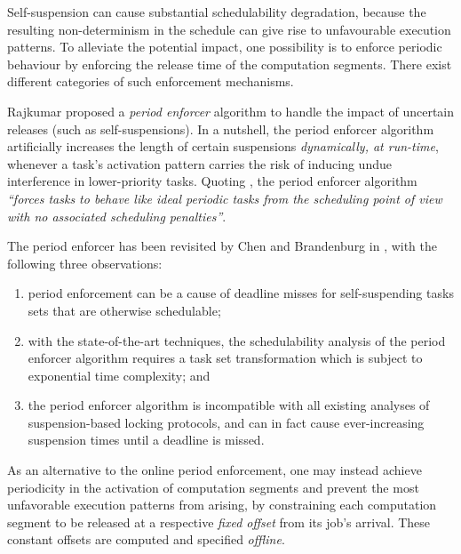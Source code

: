 \label{sec:release-enforce}

Self-suspension can cause substantial schedulability degradation, because the resulting non-determinism in the schedule can give rise 
to unfavourable execution patterns. To alleviate the potential impact, one possibility is to enforce periodic behaviour by 
enforcing the release time of the computation segments. There exist different categories of such enforcement mechanisms. 


\label{sec:period-enforce}

Rajkumar \cite{Raj:suspension1991} proposed a \emph{period enforcer} 
algorithm to handle the impact of uncertain releases (such as self-suspensions). In a nutshell, the period enforcer algorithm artificially 
increases the length of certain suspensions \emph{dynamically, at run-time},
whenever a task's activation pattern carries the risk of inducing undue interference in 
lower-priority tasks. Quoting \cite{Raj:suspension1991}, the period enforcer algorithm \textit{``forces tasks to behave like ideal 
periodic tasks from the scheduling point of view with no associated scheduling penalties''}. 

The period enforcer has been revisited by Chen and Brandenburg in \cite{ChenBrandenburg}, with the following three observations:
\begin{enumerate}
	\item period enforcement can be a cause of deadline misses for self-suspending tasks sets that are otherwise schedulable;
	\item with the state-of-the-art techniques, the schedulability analysis of the period enforcer algorithm requires a task set 
	transformation which is subject to exponential time complexity; and 	
    \item the period enforcer algorithm is incompatible with all existing analyses of suspension-based locking protocols, 
	and can in fact cause ever-increasing suspension times until a deadline is missed.
\end{enumerate}

\label{sec:static-period-enforce}

As an alternative to the online period enforcement, one may instead achieve periodicity in the activation
of computation segments and prevent the most unfavorable execution patterns from arising, by constraining
each computation segment to be released at a respective \emph{fixed offset} from its job's arrival.
These constant offsets are computed and specified \emph{offline}.
 
